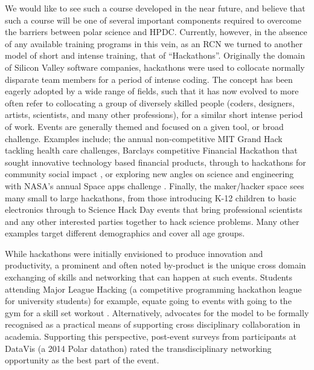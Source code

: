 \documentclass[conference]{IEEEtran}
\begin{document}
We would like to see such a course developed in the near future, and believe that such a course will be one of several important components required to overcome the barriers between polar science and HPDC. Currently, however, in the absence of any available training programs in this vein, as an RCN we turned to another model of short and intense training, that of “Hackathons”. Originally the domain of Silicon Valley software companies, hackathons were used to collocate normally disparate team members for a period of intense coding. The concept has been eagerly adopted by a wide range of fields, such that it has now evolved to more often refer to collocating a group of diversely skilled people (coders, designers, artists, scientists, and many other professions), for a similar short intense period of work.  
Events are generally themed and focused on a given tool, or broad challenge. Examples include; the annual non-competitive MIT Grand Hack \cite{noauthor_undated-zx} tackling health care challenges, Barclays competitive Financial Hackathon\cite{noauthor_undated-rc} that sought innovative technology based financial products, through to hackathons for community social impact \cite{noauthor_undated-qo,noauthor_undated-vs}, or exploring new angles on science and engineering with NASA’s annual Space apps challenge \cite{noauthor_undated-rb}.  Finally, the maker/hacker space sees many small to large hackathons, from those introducing K-12 children to basic electronics\cite{noauthor_undated-dy} through to Science Hack Day \cite{noauthor_undated-qs} events that bring professional scientists and any other interested parties together to hack science problems.  Many other examples target different demographics and cover all age groups.  

While hackathons were initially envisioned to produce innovation and productivity, a prominent and often noted by-product is the unique cross domain exchanging of skills and networking that can happen at such events. Students attending Major League Hacking \cite{noauthor_undated-tz} (a competitive programming hackathon league for university students) for example, equate going to events with going to the gym for a skill set workout \cite{Leckart2015-go}.  Alternatively, \cite{Aboab2016-tk} advocates for the model to be formally recognised as a practical means of supporting cross disciplinary collaboration in academia. Supporting this perspective, post-event surveys from participants at DataVis \cite{noauthor_undated-mn} (a 2014 Polar datathon) rated the transdisciplinary networking opportunity as the best part of the event.
\end{document}
